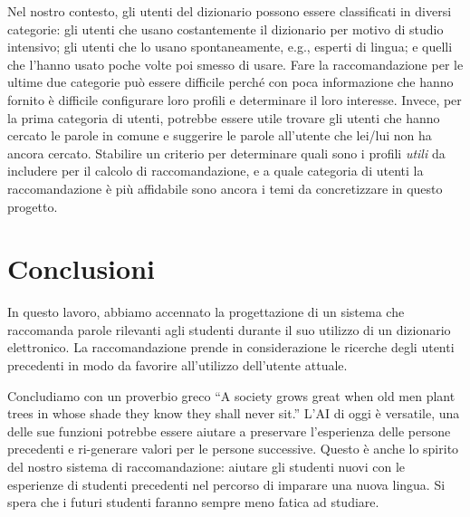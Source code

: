 \documentclass{article}
\begin{document}
Nel nostro contesto, gli utenti del dizionario possono essere classificati in diversi categorie: gli utenti che usano costantemente il dizionario per motivo di studio intensivo; gli utenti che lo usano spontaneamente, e.g., esperti di lingua; e quelli che l'hanno usato poche volte poi smesso di usare. Fare la raccomandazione per le ultime due categorie pu\`o essere difficile perch\'e con poca informazione che hanno fornito è difficile configurare loro profili e determinare il loro interesse. Invece, per la prima categoria di utenti, potrebbe essere utile trovare gli utenti che hanno cercato le parole in comune e suggerire le parole all'utente che lei/lui non ha  ancora cercato. Stabilire un criterio per determinare quali sono i profili \emph{utili} da includere per il calcolo di raccomandazione, e a quale categoria di utenti la raccomandazione è più affidabile sono ancora i temi da concretizzare in questo progetto.

\section{Conclusioni}
In questo lavoro, abbiamo accennato la progettazione di un sistema che raccomanda parole rilevanti agli studenti durante il suo utilizzo di un dizionario elettronico. La raccomandazione prende in considerazione le ricerche degli utenti precedenti in modo da favorire all'utilizzo dell'utente attuale.

Concludiamo con un proverbio greco ``A society grows great when old men plant trees in whose shade they know they shall never sit.'' 
L'AI di oggi è versatile, una delle sue funzioni potrebbe essere aiutare a preservare l'esperienza delle persone precedenti e ri-generare valori per le persone successive. Questo è anche lo spirito del nostro sistema di raccomandazione: aiutare gli studenti nuovi con le esperienze di studenti precedenti nel percorso di imparare una nuova lingua. Si spera che 
i futuri studenti faranno sempre meno fatica ad studiare.
\end{document}
